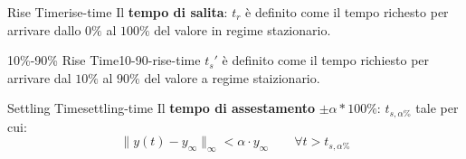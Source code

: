 \documentclass[12pt]{article}
\begin{document}
\begin{definition}{Rise Time}{rise-time}
    Il \textbf{tempo di salita}: $t_r$ \`e definito come il tempo richesto per arrivare dallo $0\%$ al $100\%$ del valore in regime stazionario.
\end{definition}

\begin{definition}{10\%-90\% Rise Time}{10-90-rise-time}
    $t_s'$ \`e definito come il tempo richiesto per arrivare dal $10\%$ al $90\%$ del valore a regime staizionario.
\end{definition}

\begin{definition}{Settling Time}{settling-time}
    Il \textbf{tempo di assestamento} $ \pm \alpha * 100\%$: $t _{s,\alpha\%}$ tale per cui:
    \[  \| y(t) - y _{\infty} \|_{\infty}  < \alpha \cdot y _{\infty} \qquad \forall t > t _{s,\alpha\%} \]
\end{definition}



\end{document}
